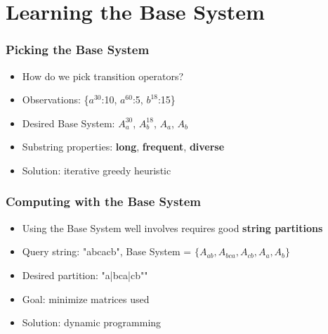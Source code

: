 \documentclass{beamer}
\begin{document}


\section{Learning the Base System}

\begin{frame}
\frametitle{Picking the Base System}
\begin{itemize}


\item How do we pick transition operators?
\item[] Observations: \{$a^{30}$:10, $a^{60}$:5, $b^{18}$:15\}

\item[] Desired Base System: {$A_a^{30}$, $A_b^{18}$, $A_a$, $A_b$}

\item Substring properties: 
\textbf{long}, \textbf{frequent}, \textbf{diverse}

\item Solution: iterative greedy heuristic 


\end{itemize}
\end{frame}


\begin{frame}
\frametitle{Computing with the Base System}
\begin{itemize}


\item Using the Base System well involves requires good \textbf{string partitions}

\item[] Query string: "abcacb", Base System = $\{A_{ab}, A_{bca}, A_{cb}, A_a, A_b \}$ 


\item[] Desired partition: "a|bca|cb""

\item Goal: minimize matrices used

\item Solution: dynamic programming

\end{itemize}
\end{frame}

\end{document}
